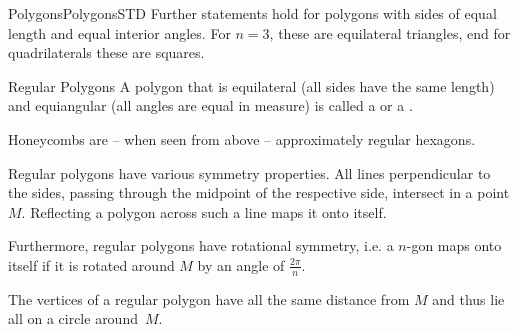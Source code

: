 \begin{MXContent}{Polygons}{Polygons}{STD}
Further statements hold for polygons with sides of equal length and equal 
interior angles. For $n=3$, these are equilateral triangles, end for 
quadrilaterals these are squares.

\begin{MXInfo}{Regular Polygons}
A polygon that is  equilateral (all sides have the same length) and
equiangular (all angles are equal in measure) is called a 
 or a
.
\end{MXInfo}

Honeycombs are -- when seen from above -- approximately regular hexagons.
\begin{center}
\end{center}

Regular polygons have various symmetry properties. All lines perpendicular to the sides,
passing through the midpoint of the respective side, intersect in a point $M$. Reflecting 
a polygon across such a line maps it onto itself.

Furthermore, regular polygons have rotational symmetry, i.e. a $n$-gon maps onto itself
if it is rotated around $M$ by an angle of $\frac{2 \pi}{n}$.

The vertices of a regular polygon have all the same distance from $M$ and thus lie 
all on a circle around~$M$.
\end{MXContent}


